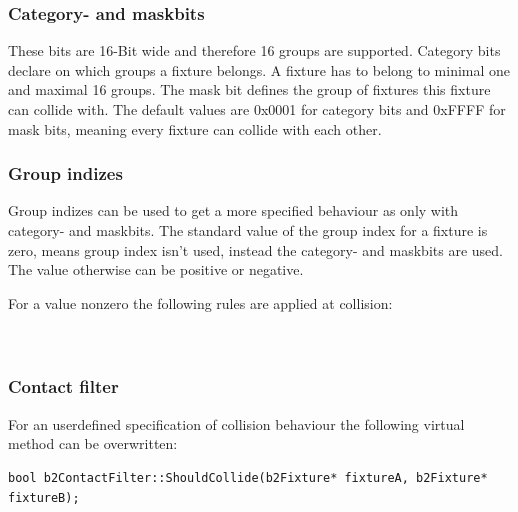 \documentclass[10pt,a4paper,DIV=11]{scrreprt}
\begin{document}
\subsubsection*{Category- and maskbits}

These bits are 16-Bit wide and therefore 16 groups are supported.
Category bits declare on which groups a fixture belongs. A fixture has to belong to minimal one and maximal 16 groups.
The mask bit defines the group of fixtures this fixture can collide with. The default values are 0x0001 for category bits and 0xFFFF for mask bits, meaning every fixture can collide with each other.

\subsubsection*{Group indizes}
Group indizes can be used to get a more specified behaviour as only with category- and maskbits.
The standard value of the group index for a fixture is zero, means group index isn't used, instead the category- and maskbits are used. The value otherwise can be positive or negative.

For a value nonzero the following rules are applied at collision: \\

   \\
\\

\subsubsection*{Contact filter}
For an userdefined specification of collision behaviour the following virtual method can be overwritten: \\
\begin{lstlisting}[caption={The contact filter method},label=lst:box2d-contactfiler]
bool b2ContactFilter::ShouldCollide(b2Fixture* fixtureA, b2Fixture* fixtureB);
\end{lstlisting}
\end{document}
